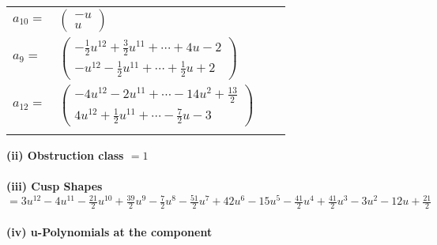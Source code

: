 \documentclass[1p]{elsarticle_modified}
\theoremstyle{definition}
\begin{document}
\begin{tabular}{m{7pt} m{180pt} m{7pt} m{180pt} }
\flushright $a_{10}=$&$\begin{pmatrix}- u\\u\end{pmatrix}$ \\
\flushright $a_{9}=$&$\begin{pmatrix}-\frac{1}{2} u^{12}+\frac{3}{2} u^{11}+\cdots+4 u-2\\- u^{12}-\frac{1}{2} u^{11}+\cdots+\frac{1}{2} u+2\end{pmatrix}$ \\
\flushright $a_{12}=$&$\begin{pmatrix}-4 u^{12}-2 u^{11}+\cdots-14 u^2+\frac{13}{2}\\4 u^{12}+\frac{1}{2} u^{11}+\cdots-\frac{7}{2} u-3\end{pmatrix}$\\&\end{tabular}
\flushleft \textbf{(ii) Obstruction class $= 1$}\\~\\
\flushleft \textbf{(iii) Cusp Shapes $= 3 u^{12}-4 u^{11}-\frac{21}{2} u^{10}+\frac{39}{2} u^9-\frac{7}{2} u^8-\frac{51}{2} u^7+42 u^6-15 u^5-\frac{41}{2} u^4+\frac{41}{2} u^3-3 u^2-12 u+\frac{21}{2}$}\\~\\
\newpage\renewcommand{\arraystretch}{1}
\flushleft \textbf{(iv) u-Polynomials at the component}\newline \\
\end{document}
